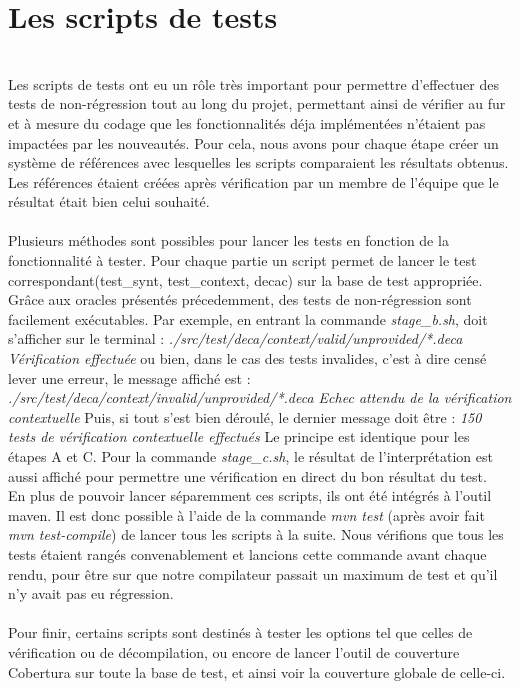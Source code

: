 \documentclass{article}
\begin{document}
\section{Les scripts de tests}
\\
Les scripts de tests ont eu un rôle très important pour permettre d'effectuer des tests de non-régression tout au long du projet, permettant ainsi de vérifier au fur et à mesure
du codage que les fonctionnalités déja implémentées n'étaient pas impactées par les nouveautés. Pour cela, nous avons pour chaque étape créer un système de références avec lesquelles les scripts
comparaient les résultats obtenus. Les références étaient créées après vérification par un membre de l'équipe que le résultat était bien celui souhaité.
\\\\
Plusieurs méthodes sont possibles pour lancer les tests en fonction de la fonctionnalité à tester. Pour chaque partie un script permet de lancer le test correspondant(test\_synt, test\_context, decac)
sur la base de test appropriée. Grâce aux oracles présentés précedemment, des tests de non-régression sont facilement exécutables.\newline
Par exemple, en entrant la commande \textit{stage\_b.sh}, doit s'afficher sur le terminal : \newline
\textit{./src/test/deca/context/valid/unprovided/*.deca \newline
Vérification effectuée} \newline
ou bien, dans le cas des tests invalides, c'est à dire censé lever une erreur, le message affiché est : \newline
\textit{./src/test/deca/context/invalid/unprovided/*.deca \newline
Echec attendu de la vérification contextuelle} \newline
Puis, si tout s'est bien déroulé, le dernier message doit être : \newline
\textit{150 tests de vérification contextuelle effectués} \newline
Le principe est identique pour les étapes A et C. Pour la commande \textit{stage\_c.sh}, le résultat
de l'interprétation est aussi affiché pour permettre une vérification en direct du bon résultat du test. \newline
\\
En plus de pouvoir lancer séparemment ces scripts, ils ont été intégrés à l’outil maven.
Il est donc possible à l’aide de la commande \textit{mvn test} (après avoir fait\textit{ mvn test-compile}) de lancer tous les scripts à la suite. Nous vérifions
que tous les tests étaient rangés convenablement et lancions cette commande avant chaque rendu, pour être sur que notre compilateur passait un maximum de test et qu'il n'y avait pas eu régression.
\\\\
Pour finir, certains scripts sont destinés à tester les options tel que celles de vérification ou de décompilation, ou encore
de lancer l'outil de couverture Cobertura sur toute la base de test, et ainsi voir la couverture globale de celle-ci.
\end{document}
